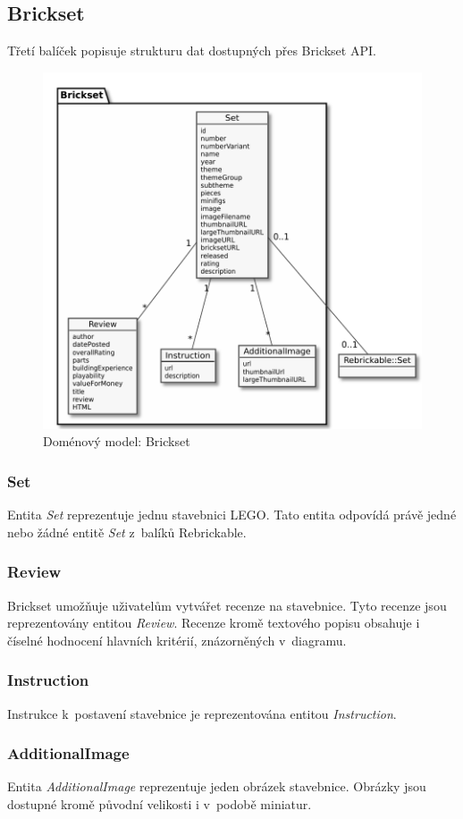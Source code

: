 \subsection{Brickset}
Třetí balíček popisuje strukturu dat dostupných přes Brickset \gls{API}.   

\begin{figure}[htbp]
    \centering
    \includegraphics[width=\textwidth,height=\textheight,keepaspectratio]{pdfs/domain_brickset}
    \caption{Doménový model: Brickset \label{diagram-domenovy-brickset}}
\end{figure}

\subsubsection*{Set}
Entita \textit{Set} reprezentuje jednu stavebnici LEGO. Tato entita odpovídá právě jedné nebo žádné entitě \textit{Set} z~balíků Rebrickable.  

\subsubsection*{Review}
Brickset umožňuje uživatelům vytvářet recenze na stavebnice. Tyto recenze jsou reprezentovány entitou \textit{Review}. Recenze kromě textového popisu obsahuje i číselné hodnocení hlavních kritérií, znázorněných v~diagramu.

\subsubsection*{Instruction} 
Instrukce k~postavení stavebnice je reprezentována entitou \textit{Instruction}.

\subsubsection*{AdditionalImage} 
Entita \textit{AdditionalImage} reprezentuje jeden obrázek stavebnice. Obrázky jsou dostupné kromě původní velikosti i v~podobě miniatur.


